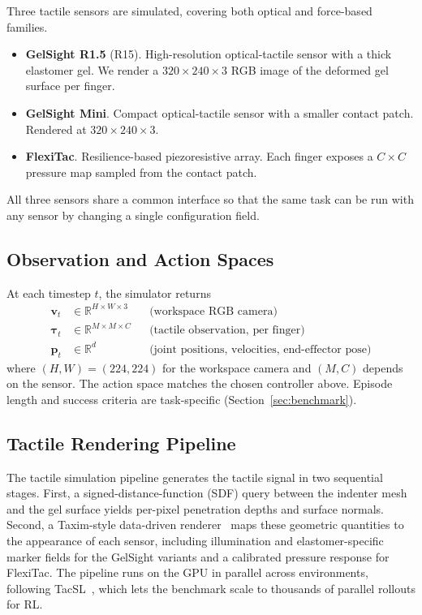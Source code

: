 \documentclass{article}
\begin{document}
Three tactile sensors are simulated, covering both optical and force-based families.
\begin{itemize}
    \item \textbf{GelSight R1.5} (R15). High-resolution optical-tactile sensor with a thick elastomer gel. We render a $320\times240\times3$ RGB image of the deformed gel surface per finger.
    \item \textbf{GelSight Mini}. Compact optical-tactile sensor with a smaller contact patch. Rendered at $320\times240\times3$.
    \item \textbf{FlexiTac}. Resilience-based piezoresistive array. Each finger exposes a $C \times C$ pressure map sampled from the contact patch.
\end{itemize}
All three sensors share a common interface so that the same task can be run with any sensor by changing a single configuration field.

\subsection{Observation and Action Spaces}

At each timestep $t$, the simulator returns
\begin{align*}
    \mathbf{v}_t &\in \mathbb{R}^{H \times W \times 3}      && \text{(workspace RGB camera)} \\
    \boldsymbol{\tau}_t &\in \mathbb{R}^{M \times M \times C} && \text{(tactile observation, per finger)} \\
    \mathbf{p}_t &\in \mathbb{R}^{d}                          && \text{(joint positions, velocities, end-effector pose)}
\end{align*}
where $(H, W) = (224, 224)$ for the workspace camera and $(M, C)$ depends on the sensor. The action space matches the chosen controller above. Episode length and success criteria are task-specific (Section~\ref{sec:benchmark}).

\subsection{Tactile Rendering Pipeline}

The tactile simulation pipeline generates the tactile signal in two sequential stages. First, a signed-distance-function (SDF) query between the indenter mesh and the gel surface yields per-pixel penetration depths and surface normals. Second, a Taxim-style data-driven renderer~\citep{si2022taxim} maps these geometric quantities to the appearance of each sensor, including illumination and elastomer-specific marker fields for the GelSight variants and a calibrated pressure response for FlexiTac. The pipeline runs on the GPU in parallel across environments, following TacSL~\citep{akinola2024tacsl}, which lets the benchmark scale to thousands of parallel rollouts for RL.
\end{document}

